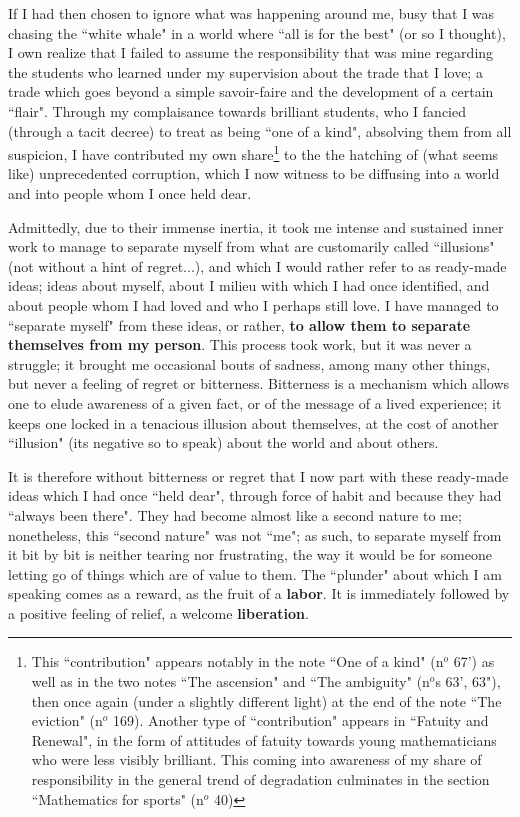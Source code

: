 If I had then chosen to ignore what was happening around me, busy that I was chasing the ``white whale" in a world where ``all is for the best" (or so I thought), I own realize that I failed to assume the responsibility that was mine regarding the students who learned under my supervision about the trade that I love; a trade which goes beyond a simple savoir-faire and the development of a certain ``flair". Through my complaisance towards brilliant students, who I fancied (through a tacit decree) to treat as being ``one of a kind", absolving them from all suspicion, I have contributed my own share\footnote{This ``contribution" appears notably in the note ``One of a kind" (n$^o$ 67') as well as in the two notes ``The ascension" and ``The ambiguity" (n$^o$s 63', 63"), then once again (under a slightly different light) at the end of the note ``The eviction" (n$^o$ 169). Another type of ``contribution" appears in ``Fatuity and Renewal", in the form of attitudes of fatuity towards young mathematicians who were less visibly brilliant. This coming into awareness of my share of responsibility in the general trend of degradation culminates in the section ``Mathematics for sports" (n$^o$ 40)} to the the hatching of (what seems like) unprecedented corruption, which I now witness to be diffusing into a world and into people whom I once held dear.

Admittedly, due to their immense inertia, it took me intense and sustained inner work to manage to separate myself from what are customarily called ``illusions" (not without a hint of regret...), and which I would rather refer to as ready-made ideas; ideas about myself, about I milieu with which I had once identified, and about people whom I had loved and who I perhaps still love. I have managed to ``separate myself" from these ideas, or rather, \textbf{to allow them to separate themselves from my person}. This process took work, but it was never a struggle; it brought me occasional bouts of sadness, among many other things, but never a feeling of regret or bitterness. Bitterness is a mechanism which allows one to elude awareness of a given fact, or of the message of a lived experience; it keeps one locked in a tenacious illusion about themselves, at the cost of another ``illusion" (its negative so to speak) about the world and about others.

It is therefore without bitterness or regret that I now part with these ready-made ideas which I had once ``held dear", through force of habit and because they had ``always been there". They had become almost like a second nature to me; nonetheless, this ``second nature" was not ``me"; as such, to separate myself from it bit by bit is neither tearing nor frustrating, the way it would be for someone letting go of things which are of value to them. The ``plunder" about which I am speaking comes as a reward, as the fruit of a \textbf{labor}. It is immediately followed by a positive feeling of relief, a welcome \textbf{liberation}.

